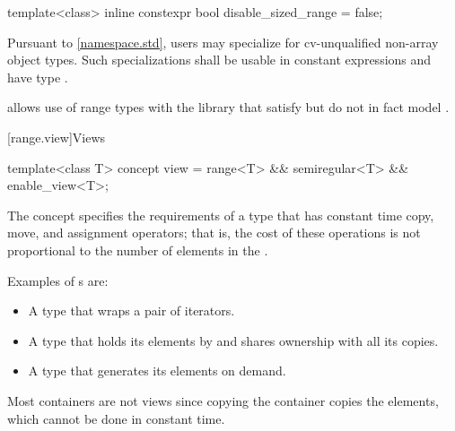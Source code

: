 %
\begin{itemdecl}
template<class>
  inline constexpr bool disable_sized_range = false;
\end{itemdecl}

\begin{itemdescr}
\pnum
\remarks
Pursuant to \ref{namespace.std},
users may specialize 
for cv-unqualified non-array object types.
Such specializations shall
be usable in constant expressions and
have type .

\pnum
\begin{note}
 allows use of range types with the library
that satisfy but do not in fact model .
\end{note}
\end{itemdescr}

[range.view]{Views}

%
\begin{itemdecl}
template<class T>
  concept view =
    range<T> && semiregular<T> && enable_view<T>;
\end{itemdecl}

\begin{itemdescr}
\pnum
The  concept specifies the requirements of a  type
that has constant time copy, move, and assignment operators; that is, the cost of
these operations is not proportional to the number of elements in the
.

\pnum
\begin{example}
Examples of s are:

\begin{itemize}
\item A  type that wraps a pair of iterators.

\item A  type that holds its elements by 
and shares ownership with all its copies.

\item A  type that generates its elements on demand.
\end{itemize}

Most containers are not views since
copying the container copies the elements,
which cannot be done in constant time.
\end{example}
\end{itemdescr}

